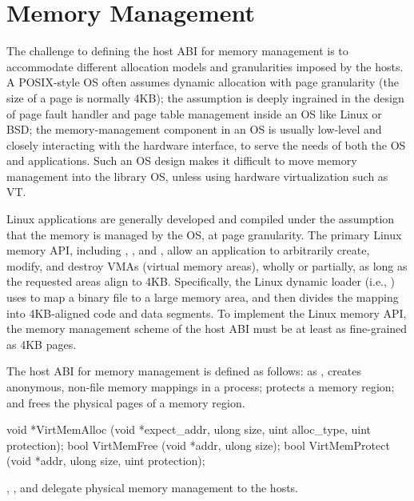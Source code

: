 \section{Memory Management}
\label{sec:abi:memory}


The challenge to defining the host ABI for memory management
is to accommodate different allocation models and granularities imposed by the hosts.
A POSIX-style OS often assumes dynamic allocation with page granularity (the size of a page is normally 4KB);
the assumption is deeply ingrained in the design of page fault handler and page table management
inside an OS like Linux or BSD;
the memory-management component in an OS
is usually low-level and closely interacting with the hardware interface,
to serve the needs of both the OS and applications.
Such an OS design makes it difficult to move memory management
into the library OS, unless using hardware virtualization such as VT.



Linux applications 
are generally developed and compiled under the assumption that the memory is managed
by the OS,
at page granularity.
The primary Linux memory API,
including , , and ,
allow an application
to arbitrarily create, modify, and destroy VMAs (virtual memory areas),
wholly or partially,
as long as the requested areas align to
4KB.
Specifically, the Linux dynamic loader (i.e., ) %
uses  to map a binary file to a large memory area,
and then divides the mapping into 4KB-aligned code and data segments.
To implement the Linux memory API,
the memory management scheme of the host ABI
must be at least as fine-grained as 4KB pages.


The host ABI for memory management is defined as follows:
as ,
 creates anonymous, non-file memory mappings in a process;
 protects a memory region;
and  frees the physical pages of a memory region.




\begin{paldef}
void *VirtMemAlloc   (void *expect_addr, ulong size,
                      uint alloc_type, uint protection);
bool  VirtMemFree    (void *addr, ulong size);
bool  VirtMemProtect (void *addr, ulong size,
                      uint protection);
\end{paldef}


, , and 
delegate physical memory management to the hosts.







